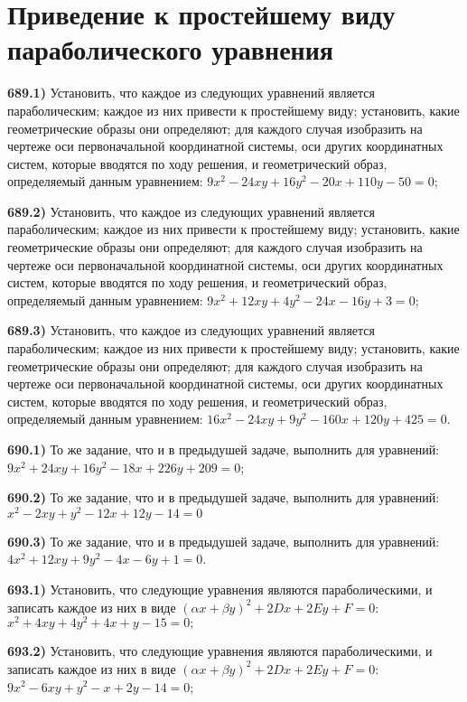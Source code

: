 \section{Приведение к простейшему виду параболического уравнения}



\textbf{689.1)} Установить, что каждое из следующих уравнений является параболическим; каждое из них привести к простейшему виду; установить, какие геометрические образы они определяют; для каждого случая изобразить на чертеже оси первоначальной координатной системы, оси других координатных систем, которые вводятся по ходу решения, и геометрический образ, определяемый данным уравнением: $9 x^2-24 x y+16 y^2-20 x+110 y-50=0$;

\textbf{689.2)} Установить, что каждое из следующих уравнений является параболическим; каждое из них привести к простейшему виду; установить, какие геометрические образы они определяют; для каждого случая изобразить на чертеже оси первоначальной координатной системы, оси других координатных систем, которые вводятся по ходу решения, и геометрический образ, определяемый данным уравнением: $9 x^2+12 x y+4 y^2-24 x-16 y+3=0$;

\textbf{689.3)} Установить, что каждое из следующих уравнений является параболическим; каждое из них привести к простейшему виду; установить, какие геометрические образы они определяют; для каждого случая изобразить на чертеже оси первоначальной координатной системы, оси других координатных систем, которые вводятся по ходу решения, и геометрический образ, определяемый данным уравнением: $16 x^2-24 x y+9 y^2-160 x+120 y+425=0$.

\textbf{690.1)} То же задание, что и в предыдушей задаче, выполнить для уравнений: $9 x^2+24 x y+16 y^2-18 x+226 y+209=0$;

\textbf{690.2)} То же задание, что и в предыдушей задаче, выполнить для уравнений: $x^2-2 x y+y^2-12 x+12 y-14=0$

\textbf{690.3)} То же задание, что и в предыдушей задаче, выполнить для уравнений: $4 x^2+12 x y+9 y^2-4 x-6 y+1=0$.

\textbf{693.1)} Установить, что следующие уравнения являются параболическими, и записать каждое из них в виде $(\alpha x+\beta y)^2+2 D x+2 E y+F=0$: $x^2+4 x y+4 y^2+4 x+y-15=0 ;$

\textbf{693.2)} Установить, что следующие уравнения являются параболическими, и записать каждое из них в виде $(\alpha x+\beta y)^2+2 D x+2 E y+F=0$: $9 x^2-6 x y+y^2-x+2 y-14=0$;

